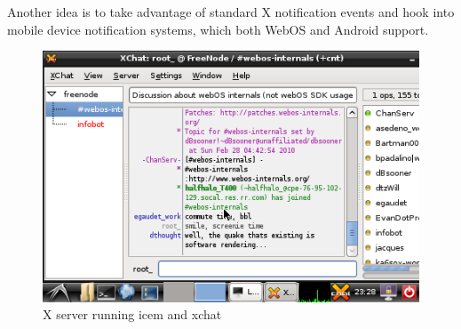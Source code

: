 Another idea is to take advantage of standard X notification events \cite{notifications} and hook into mobile device notification systems, which both WebOS and Android support. 

\begin{figure}[tbh]
\centering
\includegraphics[width=1.0\columnwidth]{xchat1}
\caption{X server running icem and xchat}
\label{fig:x_screenie}
\end{figure}
